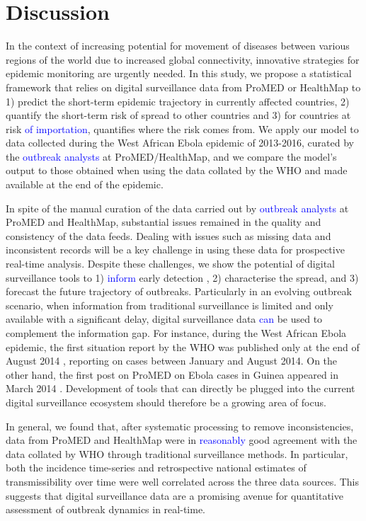 \documentclass[9pt,twocolumn,twoside,lineno]{pnas-new}
\newcommand{\sangeeta}[1]{\textcolor{blue}{#1}}
\begin{document}
% 

\section*{Discussion}\label{discussion}

In the context of increasing potential for movement of diseases between
various regions of the world due to increased global connectivity,
innovative strategies for epidemic monitoring are urgently needed. In
this study, we propose a statistical framework that relies on digital
surveillance data from ProMED or HealthMap to 1) predict the short-term
epidemic trajectory in currently affected countries, 2) quantify the
short-term risk of spread to other countries and 3) for countries at
risk \sangeeta{of importation}, quantifies where the risk comes from. We apply our model to data
collected during the West African Ebola epidemic of 2013-2016, curated
by the \sangeeta{outbreak analysts} at ProMED/HealthMap, and we compare the model's output
to those obtained when using the data collated by the WHO and made
available at the end of the epidemic.

In spite of the manual curation of the data carried out by
\sangeeta{outbreak analysts} at ProMED and HealthMap, substantial issues remained in
the quality and consistency of the data feeds. Dealing with issues such
as missing data and inconsistent records will be a key challenge in
using these data for prospective real-time analysis. Despite these
challenges, we show the potential of digital surveillance tools to
1) \sangeeta{inform} early detection , 2) characterise the spread, and 3) forecast
the future trajectory of outbreaks. Particularly in an evolving outbreak
scenario, when information from traditional surveillance is limited and
only available with a significant delay, digital surveillance data \sangeeta{can}
be used to complement the information gap. For instance, during the West
African Ebola epidemic, the first situation report by the WHO was
published only at the end of August 2014 \cite{whositrep}, 
reporting on cases between January and August 2014. On the other
hand, the first post on ProMED on Ebola cases in Guinea appeared in
March 2014 \cite{pmfirstebola}. Development of tools that can directly be
plugged into the current digital surveillance ecosystem should therefore
be a growing area of focus.

In general, we found that, after systematic processing to remove
inconsistencies, data from ProMED and HealthMap were in
\sangeeta{reasonably} good agreement
with the data collated by WHO through traditional surveillance methods.
In particular, both the incidence time-series and retrospective national
estimates of transmissibility over time were well correlated across the
three data sources. This suggests that digital surveillance data are a
promising avenue for quantitative assessment of
outbreak dynamics in real-time. 
\end{document}
